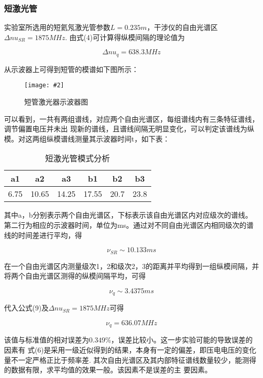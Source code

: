 \documentclass[12pt,a4paper]{article}
\newcommand{\be}[1]{
    \begin{equation}
        #1
    \end{equation}
}
\newcommand{\bfig}[3]{
    \begin{figure}[H]
        \centering
        \texttt{[image: \#2]}
        \caption{#3}
    \end{figure}
}
\begin{document}
\subsubsection{短激光管}
实验室所选用的短氦氖激光管参数$L=0.235m$，干涉仪的自由光谱区$\Delta nu_{SR}=1875MHz$. 由式(4)可计算得纵模间隔的理论值为
\be{\Delta nu_q=638.3MHz}
从示波器上可得到短管的模谱如下图所示：
\bfig{0.6}{短管激光器示意图.jpg}{短管激光器示波器图}
可以看到，一共有两组谱线，对应两个自由光谱区，每组谱线内有三条特征谱线，调节偏置电压并未出
现新的谱线，且谱线间隔无明显变化，可以判定该谱线为纵模。对这两组纵模谱线测量其示波器时间t，如下表：
\begin{table}[H]
    \begin{tabular}{|c|c|c|c|c|c|}
    \hline
    a1   & a2    & a3    & b1    & b2   & b3   \\ \hline
    6.75 & 10.65 & 14.25 & 17.55 & 20.7 & 23.8 \\ \hline
    \end{tabular}
    \caption{短激光管模式分析}
    \end{table}
其中a，b分别表示两个自由光谱区，下标表示该自由光谱区内对应级次的谱线。第二行为相应的示波器时间，单位为ms。通过对不同自由光谱区内相同级次的谱线的时间差进行平均，得
\be{\nu_{SR}\sim 10.133ms}
在一个自由光谱区内测量级次1，2和级次2，3的距离并平均得到一组纵模间隔，并将两个自由光谱区测得的纵模间隔平均，可得
\be{\nu_q\sim 3.4375ms}
代入公式(9)及$\Delta nu_{SR}=1875MHz$可得
\be{\nu_q=636.07MHz}
该值与标准值的相对误差为$0.349\%$，误差比较小。这一步实验可能的导致误差的因素有
式(6)是采用一级近似得到的结果，本身有一定的偏差，即压电电压的变化量不一定严格正比于频率差.
其次自由光谱区及其内部特征谱线数量较少，能测得的数据有限，求平均值的效果一般。该因素不是误差的主
要因素。
\end{document}
